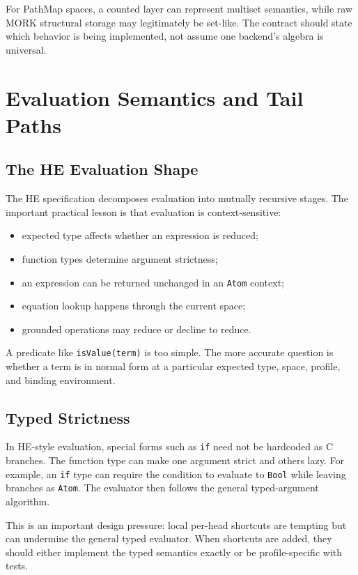 \documentclass[11pt]{article}
\newcommand{\HE}{HE}
\newcommand{\PathMap}{PathMap}
\newcommand{\MORK}{MORK}
\begin{document}
For \PathMap{} spaces, a counted layer can represent multiset semantics, while raw \MORK{} structural storage may legitimately be set-like.  The contract should state which behavior is being implemented, not assume one backend's algebra is universal.

\section{Evaluation Semantics and Tail Paths}

\subsection{The HE Evaluation Shape}

The \HE{} specification decomposes evaluation into mutually recursive stages.  The important practical lesson is that evaluation is context-sensitive:

\begin{itemize}[leftmargin=*]
  \item expected type affects whether an expression is reduced;
  \item function types determine argument strictness;
  \item an expression can be returned unchanged in an \texttt{Atom} context;
  \item equation lookup happens through the current space;
  \item grounded operations may reduce or decline to reduce.
\end{itemize}

A predicate like \texttt{isValue(term)} is too simple.  The more accurate question is whether a term is in normal form at a particular expected type, space, profile, and binding environment.

\subsection{Typed Strictness}

In \HE{}-style evaluation, special forms such as \texttt{if} need not be hardcoded as C branches.  The function type can make one argument strict and others lazy.  For example, an \texttt{if} type can require the condition to evaluate to \texttt{Bool} while leaving branches as \texttt{Atom}.  The evaluator then follows the general typed-argument algorithm.

This is an important design pressure: local per-head shortcuts are tempting but can undermine the general typed evaluator.  When shortcuts are added, they should either implement the typed semantics exactly or be profile-specific with tests.
\end{document}
